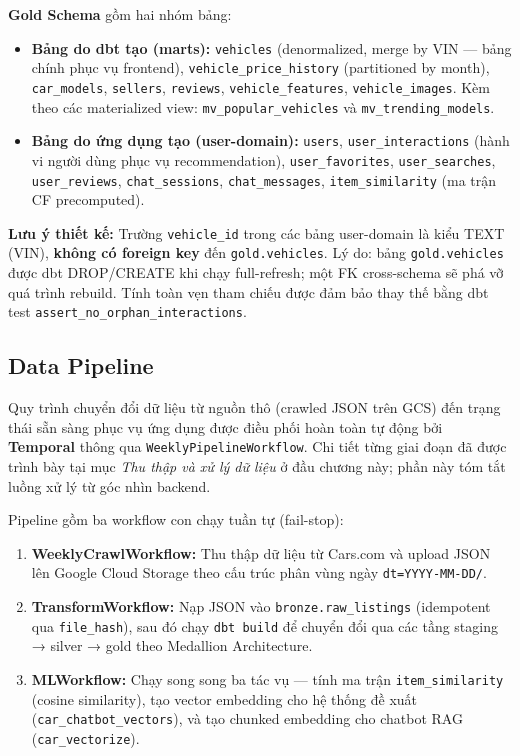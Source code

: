 \noindent \textbf{Gold Schema} gồm hai nhóm bảng:
\begin{itemize}
    \item \textbf{Bảng do dbt tạo (marts):} \texttt{vehicles} (denormalized, merge by VIN — bảng chính phục vụ frontend), \texttt{vehicle\_price\_history} (partitioned by month), \texttt{car\_models}, \texttt{sellers}, \texttt{reviews}, \texttt{vehicle\_features}, \texttt{vehicle\_images}. Kèm theo các materialized view: \texttt{mv\_popular\_vehicles} và \texttt{mv\_trending\_models}.
    \item \textbf{Bảng do ứng dụng tạo (user-domain):} \texttt{users}, \texttt{user\_interactions} (hành vi người dùng phục vụ recommendation), \texttt{user\_favorites}, \texttt{user\_searches}, \texttt{user\_reviews}, \texttt{chat\_sessions}, \texttt{chat\_messages}, \texttt{item\_similarity} (ma trận CF precomputed).
\end{itemize}

\textbf{Lưu ý thiết kế:} Trường \texttt{vehicle\_id} trong các bảng user-domain là kiểu TEXT (VIN), \textbf{không có foreign key} đến \texttt{gold.vehicles}. Lý do: bảng \texttt{gold.vehicles} được dbt DROP/CREATE khi chạy full-refresh; một FK cross-schema sẽ phá vỡ quá trình rebuild. Tính toàn vẹn tham chiếu được đảm bảo thay thế bằng dbt test \texttt{assert\_no\_orphan\_interactions}.

\subsection{Data Pipeline}

Quy trình chuyển đổi dữ liệu từ nguồn thô (crawled JSON trên GCS) đến trạng thái sẵn sàng phục vụ ứng dụng được điều phối hoàn toàn tự động bởi \textbf{Temporal} thông qua \texttt{WeeklyPipelineWorkflow}. Chi tiết từng giai đoạn đã được trình bày tại mục \textit{Thu thập và xử lý dữ liệu} ở đầu chương này; phần này tóm tắt luồng xử lý từ góc nhìn backend.

Pipeline gồm ba workflow con chạy tuần tự (fail-stop):

\begin{enumerate}
    \item \textbf{WeeklyCrawlWorkflow:} Thu thập dữ liệu từ Cars.com và upload JSON lên Google Cloud Storage theo cấu trúc phân vùng ngày \texttt{dt=YYYY-MM-DD/}.
    \item \textbf{TransformWorkflow:} Nạp JSON vào \texttt{bronze.raw\_listings} (idempotent qua \texttt{file\_hash}), sau đó chạy \texttt{dbt build} để chuyển đổi qua các tầng staging → silver → gold theo Medallion Architecture.
    \item \textbf{MLWorkflow:} Chạy song song ba tác vụ — tính ma trận \texttt{item\_similarity} (cosine similarity), tạo vector embedding cho hệ thống đề xuất (\texttt{car\_chatbot\_vectors}), và tạo chunked embedding cho chatbot RAG (\texttt{car\_vectorize}).
\end{enumerate}

